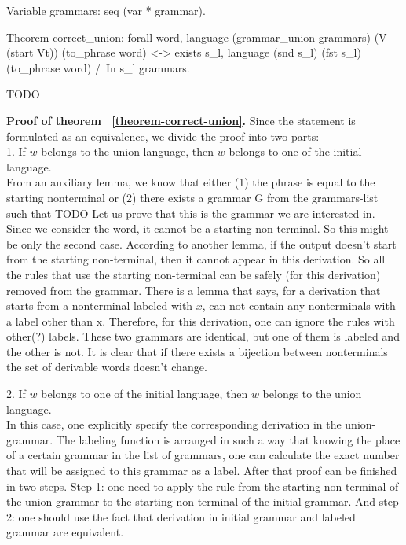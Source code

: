 \begin{listing}[h]
    \begin{pyglist}[language=coq, numbers=none, numbersep=5pt]
  Variable grammars: seq (var * grammar).

  Theorem correct_union:
    forall word, 
      language (grammar_union grammars) 
        (V (start Vt)) (to_phrase word) <->
      exists s_l, 
        language (snd s_l) (fst s_l) 
          (to_phrase word) /\ 
        In s_l grammars.
    \end{pyglist}
    \caption{TODO}
    \label{lst:verbments1}
\end{listing}


\textbf{Proof of theorem ~\ref{theorem-correct-union}.} Since the statement is formulated as an equivalence, we divide the proof into two parts:\\
1. If $w$ belongs to the union language, then $w$ belongs to one of the initial language. \\
From an auxiliary lemma, we know that either (1) the phrase is equal to the starting nonterminal or (2) there exists a grammar G from the grammars-list such that TODO
Let us prove that this is the grammar we are interested in.
Since we consider the word, it cannot be a starting non-terminal. So this might be only the second case.
According to another lemma, if the output doesn't start from the starting non-terminal, then it cannot appear in this derivation. So all the rules that use the starting non-terminal can be safely (for this derivation) removed from the grammar.
There is a lemma that says, for a derivation that starts from a nonterminal labeled with $x$, can not contain any nonterminals with a label other than x. Therefore, for this derivation, one can ignore the rules with other(?) labels.
These two grammars are identical, but one of them is labeled and the other is not. It is clear that if there exists a bijection between nonterminals the set of derivable words doesn't change.

2. If $w$ belongs to one of the initial language, then $w$ belongs to the union language. \\
In this case, one explicitly specify the corresponding derivation in the union-grammar.
The labeling function is arranged in such a way that knowing the place of a certain grammar in the list of grammars, one can calculate the exact number that will be assigned to this grammar as a label.
After that proof can be finished in two steps. Step 1: one need to apply the rule from the starting non-terminal of the union-grammar to the starting non-terminal of the initial grammar. And step 2: one should use the fact that derivation in initial grammar and labeled grammar are equivalent.


